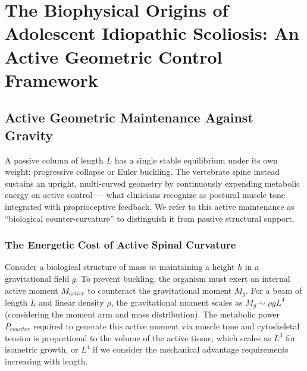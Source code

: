 \section{The Biophysical Origins of Adolescent Idiopathic Scoliosis: An Active Geometric Control Framework}

\begin{abstract}
We derive the necessary and sufficient conditions for the onset of Idiopathic Scoliosis during rapid adolescent growth, moving beyond correlative observations to a first-principles causal mechanism. By modeling the human spine as an active control system regulating its own geometry against gravity, we demonstrate that vulnerability to deformity arises from a fundamental limitation in biological energy scaling: the metabolic cost of maintaining straightness ($L^4$) outpaces the diffusive nutrient supply ($L^2$). We resolve the ``Gravitational Paradox'' by proposing that morphogenesis operates as a \textbf{Thermodynamic Standing Wave}, where scoliosis represents a dissipative buckling event triggered when the organism can no longer afford the energy tax of the anti-gravitational S-curve. We identify a critical instability threshold defined by the product of proprioceptive gain, growth velocity, and metabolic capacity, mapping these parameters to specific molecular candidates including PIEZO2, LBX1, and mitochondrial regulators.
\end{abstract}

\subsection{Active Geometric Maintenance Against Gravity}

A passive column of length $L$ has a single stable equilibrium under its own weight: progressive collapse or Euler buckling. The vertebrate spine instead sustains an upright, multi-curved geometry by continuously expending metabolic energy on active control --- what clinicians recognize as postural muscle tone integrated with proprioceptive feedback. We refer to this active maintenance as ``biological counter-curvature'' to distinguish it from passive structural support.

\subsubsection{The Energetic Cost of Active Spinal Curvature}
Consider a biological structure of mass $m$ maintaining a height $h$ in a gravitational field $g$. To prevent buckling, the organism must exert an internal active moment $M_{active}$ to counteract the gravitational moment $M_g$. For a beam of length $L$ and linear density $\rho$, the gravitational moment scales as $M_g \sim \rho g L^4$ (considering the moment arm and mass distribution). The metabolic power $P_{counter}$ required to generate this active moment via muscle tone and cytoskeletal tension is proportional to the volume of the active tissue, which scales as $L^3$ for isometric growth, or $L^4$ if we consider the mechanical advantage requirements increasing with length.

